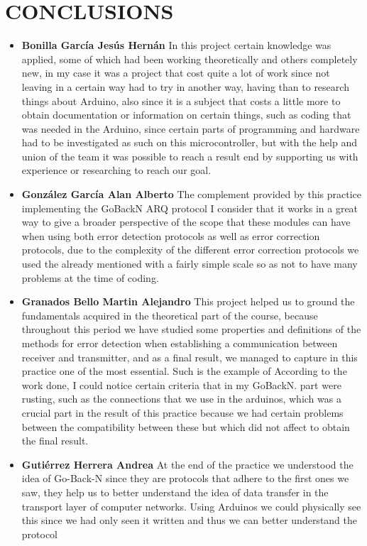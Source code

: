 \documentclass[journal,trans]{IEEEtran}
\begin{document}
\section{\textbf{CONCLUSIONS}}

\begin{itemize}

\item \textbf{Bonilla García Jesús Hernán}
In this project certain knowledge was applied, some of which had been working theoretically and others completely new, in my case it was a project that cost quite a lot of work since not leaving in a certain way had to try in another way, having than to research things about Arduino, also since it is a subject that costs a little more to obtain documentation or information on certain things, such as coding that was needed in the Arduino, since certain parts of programming and hardware had to be investigated as such
on this microcontroller, but with the help and union of the team it was possible to reach a result end by supporting us with experience or researching to reach our goal.

\item \textbf{González García Alan Alberto}
The complement provided by this practice implementing the GoBackN ARQ protocol I consider that it works in a great way to give a broader perspective of the scope that these modules can have when using both error detection protocols as well as error correction protocols, due to the complexity of the different error correction protocols we used the already mentioned with a fairly simple scale so as not to have many problems at the time of coding.


\item \textbf{Granados Bello Martin Alejandro}
This project helped us to ground the fundamentals acquired in the theoretical part of the course, because throughout this period we have studied some properties and definitions of the methods for error detection when establishing a communication between receiver and transmitter, and as a final result, we managed to capture in this practice one of the most essential. Such is the example of According to the work done, I could notice certain criteria that in my GoBackN. part were rusting, such as the connections that we use in the arduinos, which was a crucial part in the result of this practice because we had certain problems between the compatibility between these but which did not affect to obtain the final result.


\item \textbf{Gutiérrez Herrera Andrea}
At the end of the practice we understood the idea of Go-Back-N since they are protocols that adhere to the first ones we saw, they help us to better understand the idea of data transfer in the transport layer of computer networks. Using Arduinos we could physically see this since we had only seen it written and thus we can better understand the protocol



\end{itemize}
\end{document}
